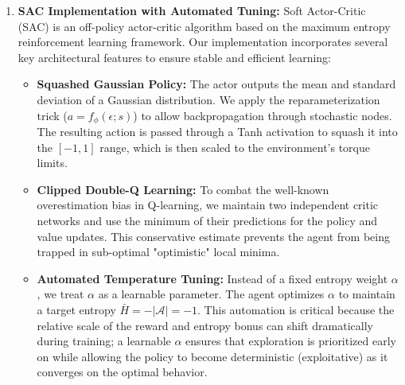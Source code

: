 \documentclass[11pt]{article}
\begin{document}
\begin{enumerate}
    \item \textbf{SAC Implementation with Automated Tuning:} Soft Actor-Critic (SAC) is an off-policy actor-critic algorithm based on the maximum entropy reinforcement learning framework. Our implementation incorporates several key architectural features to ensure stable and efficient learning:
    \begin{itemize}
        \item \textbf{Squashed Gaussian Policy:} The actor outputs the mean and standard deviation of a Gaussian distribution. We apply the reparameterization trick ($a = f_\phi(\epsilon; s)$) to allow backpropagation through stochastic nodes. The resulting action is passed through a Tanh activation to squash it into the $[-1, 1]$ range, which is then scaled to the environment's torque limits.
        \item \textbf{Clipped Double-Q Learning:} To combat the well-known overestimation bias in Q-learning, we maintain two independent critic networks and use the minimum of their predictions for the policy and value updates. This conservative estimate prevents the agent from being trapped in sub-optimal "optimistic" local minima.
        \item \textbf{Automated Temperature Tuning:} Instead of a fixed entropy weight $\alpha$, we treat $\alpha$ as a learnable parameter. The agent optimizes $\alpha$ to maintain a target entropy $\bar{H} = -|\mathcal{A}| = -1$. This automation is critical because the relative scale of the reward and entropy bonus can shift dramatically during training; a learnable $\alpha$ ensures that exploration is prioritized early on while allowing the policy to become deterministic (exploitative) as it converges on the optimal behavior.
    \end{itemize}


\end{enumerate}
\end{document}
